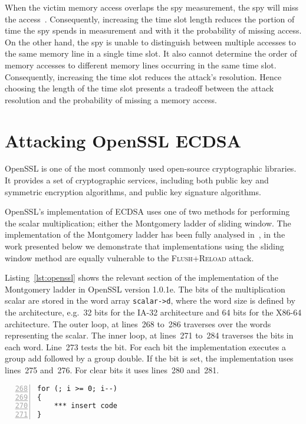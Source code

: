 \documentclass[twocolumn]{article}
\newcommand{\fl}{\textsc{Flu\-sh+\allowbreak Re\-load}\xspace}
\newcommand{\myupcase}[1]{\uppercase{#1}}
\begin{document}
When the victim memory access overlaps the spy measurement, the spy will miss the access~\cite{yarom13flush}.
Consequently, increasing the time slot length reduces the portion of time the spy spends in
measurement and with it the probability of missing access.
On the other hand, the spy is unable to distinguish between multiple accesses to the same memory line in 
a single time slot.
It also cannot determine the order of memory accesses to different memory lines occurring in the same time slot.
Consequently, increasing the time slot reduces the attack's resolution.
Hence choosing the length of the time slot presents a tradeoff between the attack resolution
and the probability of missing a memory access.


\section{Attacking OpenSSL ECDSA}\label{sec:attack}
OpenSSL is one of the most commonly used  open-source cryptographic libraries.
It provides a set of cryptographic services, including both public key and symmetric encryption 
algorithms, and public key signature algorithms.

OpenSSL's implementation of \myupcase{ecdsa} uses one of two methods for performing the scalar multiplication; either the Montgomery ladder of sliding window. The implementation of the Montgomery ladder has been fully analysed in~\cite{yarom_benger_2013}, in the work presented below we demonstrate that implementations using the sliding window method are equally vulnerable to the \fl attack.


Listing~\ref{lst:openssl} shows the relevant section of the implementation of the Montgomery ladder in OpenSSL version 1.0.1e.
The bits of the multiplication scalar are stored in the word array \texttt{scalar->d},
where the word size is defined by the architecture, e.g.\ 32 bits for the IA-32 architecture and 64 bits for the X86-64 architecture.
The outer loop, at lines~268 to~286 traverses over the words representing the scalar.
The inner loop, at lines~271 to~284 traverses the bits in each word.
Line~273 tests the bit. 
For each bit the implementation executes a group add followed by a group double.
If the bit is set, the implementation uses lines~275 and~276.
For clear bits it uses lines~280 and~281.

\begin{lstlisting}[numbers=left,firstnumber=268,float=htb,caption=OpenSSL implementation of the wNAF sliding window,label=lst:openssl]
for (; i >= 0; i--)
{
    *** insert code
}
\end{lstlisting}
\end{document}
